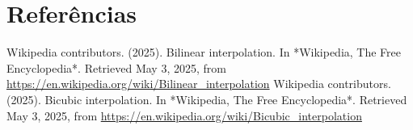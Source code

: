 \documentclass[12pt, a4paper]{article}
\begin{document}
\section{Referências}
\begin{thebibliography}{9}
     Wikipedia contributors. (2025). Bilinear interpolation. In *Wikipedia, The Free Encyclopedia*. Retrieved May 3, 2025, from \url{https://en.wikipedia.org/wiki/Bilinear_interpolation}
     Wikipedia contributors. (2025). Bicubic interpolation. In *Wikipedia, The Free Encyclopedia*. Retrieved May 3, 2025, from \url{https://en.wikipedia.org/wiki/Bicubic_interpolation}
\end{thebibliography}

\end{document}
